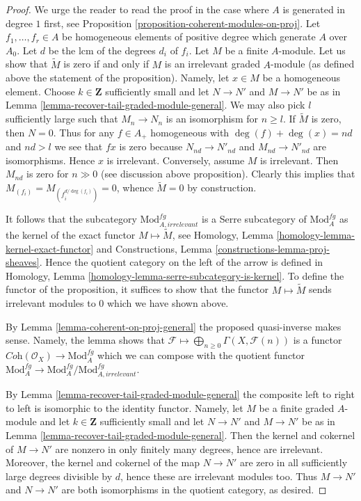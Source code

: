\documentclass[10pt,a4paper]{amsart}
\theoremstyle{plain}
\theoremstyle{definition}
\theoremstyle{remark}
\numberwithin{equation}{subsection}
\begin{document}
\begin{proof}
We urge the reader to read the proof in the case where $A$
is generated in degree $1$ first, see
Proposition \ref{proposition-coherent-modules-on-proj}.
Let $f_1, \ldots, f_r \in A$ be homogeneous elements of positive degree
which generate $A$ over $A_0$. Let $d$ be the lcm of the degrees
$d_i$ of $f_i$. Let $M$ be a finite $A$-module.
Let us show that $\widetilde{M}$ is zero if and
only if $M$ is an irrelevant graded $A$-module (as defined above
the statement of the proposition). Namely, let $x \in M$ be a
homogeneous element.
Choose $k \in \mathbf{Z}$ sufficiently small and let
$N \to N'$ and $M \to N'$ be as in
Lemma \ref{lemma-recover-tail-graded-module-general}.
We may also pick $l$ sufficiently large such that
$M_n \to N_n$ is an isomorphism for $n \geq l$.
If $\widetilde{M}$ is zero, then $N = 0$.
Thus for any $f \in A_+$ homogeneous with
$\deg(f) + \deg(x) = nd$ and $nd > l$ we see that $fx$ is zero
because $N_{nd} \to N'_{nd}$ and $M_{nd} \to N'_{nd}$ are isomorphisms.
Hence $x$ is irrelevant.
Conversely, assume $M$ is irrelevant. Then $M_{nd}$ is zero
for $n \gg 0$ (see discussion above proposition).
Clearly this implies that $M_{(f_i)} = M_{(f_i^{d/\deg(f_i)})} = 0$,
whence $\widetilde{M} = 0$ by construction.

\medskip\noindent
It follows that the subcategory $\text{Mod}^{fg}_{A, irrelevant}$
is a Serre subcategory of $\text{Mod}^{fg}_A$ as the kernel
of the exact functor $M \mapsto \widetilde M$, see
Homology, Lemma \ref{homology-lemma-kernel-exact-functor}
and Constructions, Lemma \ref{constructions-lemma-proj-sheaves}.
Hence the quotient category on the left of the arrow is defined
in Homology, Lemma \ref{homology-lemma-serre-subcategory-is-kernel}.
To define the functor of the proposition, it suffices to show that
the functor $M \mapsto \widetilde M$ sends irrelevant modules to $0$
which we have shown above.

\medskip\noindent
By Lemma \ref{lemma-coherent-on-proj-general} the proposed quasi-inverse
makes sense. Namely, the lemma shows that
$\mathcal{F} \longmapsto \bigoplus_{n \geq 0} \Gamma(X, \mathcal{F}(n))$
is a functor $\textit{Coh}(\mathcal{O}_X) \to \text{Mod}^{fg}_A$
which we can compose with the quotient functor
$\text{Mod}^{fg}_A \to \text{Mod}^{fg}_A/\text{Mod}^{fg}_{A, irrelevant}$.

\medskip\noindent
By Lemma \ref{lemma-recover-tail-graded-module-general}
the composite left to right to left is isomorphic to the identity functor.
Namely, let $M$ be a finite graded $A$-module and let
$k \in \mathbf{Z}$ sufficiently small and let
$N \to N'$ and $M \to N'$ be as in
Lemma \ref{lemma-recover-tail-graded-module-general}.
Then the kernel and cokernel of $M \to N'$ are nonzero in
only finitely many degrees, hence are irrelevant. Moreover, the
kernel and cokernel of the map $N \to N'$ are zero in all sufficiently
large degrees divisible by $d$, hence these are irrelevant modules too.
Thus $M \to N'$ and $N \to N'$ are both isomorphisms in the quotient
category, as desired.


\end{proof}
\end{document}

